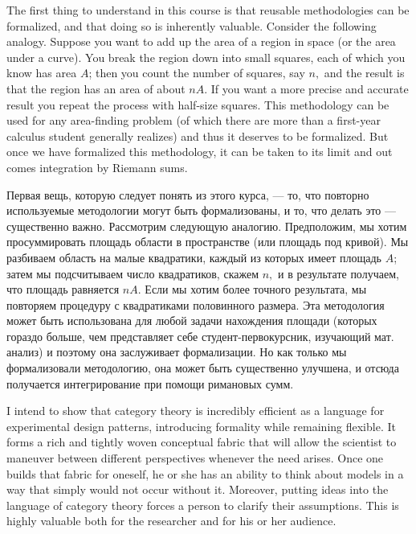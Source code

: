 \documentclass[CT4S-EN-RU]{subfiles}
\begin{document}
\begin{blockENG}
The first thing to understand in this course is that reusable methodologies can be formalized, and that doing so is inherently valuable. Consider the following analogy. Suppose you want to add up the area of a region in space (or the area under a curve). You break the region down into small squares, each of which you know has area $A$; then you count the number of squares, say $n,$ and the result is that the region has an area of about $nA.$ If you want a more precise and accurate result you repeat the process with half-size squares. This methodology can be used for any area-finding problem (of which there are more than a first-year calculus student generally realizes) and thus it deserves to be formalized. But once we have formalized this methodology, it can be taken to its limit and out comes integration by Riemann sums.
\end{blockENG}

\begin{blockRUS}
Первая вещь, которую следует понять из этого курса, — то, что повторно используемые методологии могут быть формализованы, и то, что делать это — существенно важно. Рассмотрим следующую аналогию. Предположим, мы хотим просуммировать площадь области в пространстве (или площадь под кривой). Мы разбиваем область на малые квадратики, каждый из которых имеет площадь $A$; затем мы подсчитываем число квадратиков, скажем $n,$ и в результате получаем, что площадь равняется $nA.$ Если мы хотим более точного результата, мы повторяем процедуру с квадратиками половинного размера. Эта методология может быть использована для любой задачи нахождения площади (которых гораздо больше, чем представляет себе студент-первокурсник, изучающий мат. анализ) и поэтому она заслуживает формализации. Но как только мы формализовали методологию, она может быть существенно улучшена, и отсюда получается интегрирование при помощи римановых сумм. 
\end{blockRUS}

\begin{blockENG}
I intend to show that category theory is incredibly efficient as a language for experimental design patterns, introducing formality while remaining flexible. It forms a rich and tightly woven conceptual fabric that will allow the scientist to maneuver between different perspectives whenever the need arises. Once one builds that fabric for oneself, he or she has an ability to think about models in a way that simply would not occur without it.  Moreover, putting ideas into the language of category theory forces a person to clarify their assumptions. This is highly valuable both for the researcher and for his or her audience.
\end{blockENG}
\end{document}
